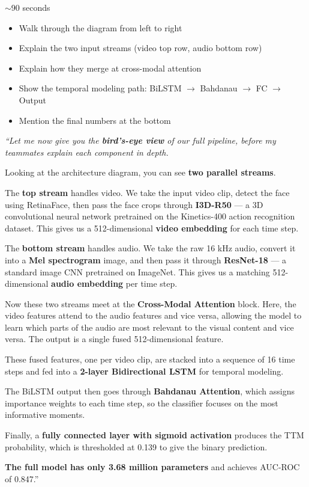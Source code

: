 \documentclass[11pt, a4paper]{article}
\newcommand{\timing}[1]{%
  \begin{tcolorbox}[timebox, title=Suggested Time]
    \color{AccOrange} #1
  \end{tcolorbox}
}
\newcommand{\keypoints}[1]{%
  \begin{tcolorbox}[keybox, title=Key Points to Cover]
    #1
  \end{tcolorbox}
}
\newcommand{\script}[1]{%
  \begin{mdframed}[
    backgroundcolor=white,
    linecolor=MidText!40,
    linewidth=0.5pt,
    leftmargin=0pt,
    rightmargin=0pt,
    innerleftmargin=10pt,
    innerrightmargin=8pt,
    innertopmargin=8pt,
    innerbottommargin=8pt,
    roundcorner=3pt
  ]
  \itshape\color{MidText}
  #1
  \end{mdframed}
}
\begin{document}
\timing{$\sim$90 seconds}

\keypoints{%
\begin{itemize}[leftmargin=*, itemsep=2pt]
  \item Walk through the diagram from left to right
  \item Explain the two input streams (video top row, audio bottom row)
  \item Explain how they merge at cross-modal attention
  \item Show the temporal modeling path: BiLSTM $\to$ Bahdanau $\to$ FC $\to$ Output
  \item Mention the final numbers at the bottom
\end{itemize}
}

\script{%
``Let me now give you the \textbf{bird's-eye view} of our full pipeline, before my teammates explain each component in depth.

Looking at the architecture diagram, you can see \textbf{two parallel streams}.

The \textbf{top stream} handles video. We take the input video clip, detect the face using RetinaFace, then pass the face crops through \textbf{I3D-R50} --- a 3D convolutional neural network pretrained on the Kinetics-400 action recognition dataset. This gives us a 512-dimensional \textbf{video embedding} for each time step.

The \textbf{bottom stream} handles audio. We take the raw 16 kHz audio, convert it into a \textbf{Mel spectrogram} image, and then pass it through \textbf{ResNet-18} --- a standard image CNN pretrained on ImageNet. This gives us a matching 512-dimensional \textbf{audio embedding} per time step.

Now these two streams meet at the \textbf{Cross-Modal Attention} block. Here, the video features attend to the audio features and vice versa, allowing the model to learn which parts of the audio are most relevant to the visual content and vice versa. The output is a single fused 512-dimensional feature.

These fused features, one per video clip, are stacked into a sequence of 16 time steps and fed into a \textbf{2-layer Bidirectional LSTM} for temporal modeling.

The BiLSTM output then goes through \textbf{Bahdanau Attention}, which assigns importance weights to each time step, so the classifier focuses on the most informative moments.

Finally, a \textbf{fully connected layer with sigmoid activation} produces the TTM probability, which is thresholded at 0.139 to give the binary prediction.

\textbf{The full model has only 3.68 million parameters} and achieves AUC-ROC of 0.847.''
}
\end{document}
